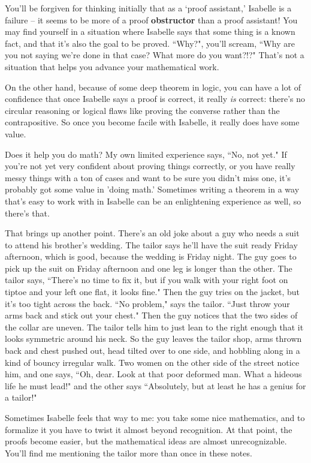 You'll be forgiven for thinking initially that as a `proof assistant,' Isabelle is a failure -- it seems to be more of a proof \textbf{obstructor} than a proof assistant! You may find yourself in a situation where Isabelle says that some thing is a known fact, and that it's also the goal to be proved. ``Why?", you'll scream, ``Why are you not saying we're done in that case? What more do you want?!?" That's not a situation that helps you advance your mathematical work.  

On the other hand, because of some deep theorem in logic, you can have a lot of confidence that once Isabelle says a proof is correct, it really \textit{is} correct: there's no circular reasoning or logical flaws like proving the converse rather than the contrapositive. So once you become facile with Isabelle, it really does have some value. 

Does it help you do math? My own limited experience says, ``No, not yet." If you're not yet very confident about proving things correctly, or you have really messy things with a ton of cases and want to be sure you didn't miss one, it's probably got some value in 'doing math.' Sometimes writing a theorem in a way that's easy to work with in Isabelle can be an enlightening experience as well, so there's that. 

That brings up another point. There's an old joke about a guy who needs a suit to attend his brother's wedding. The tailor says he'll have the suit ready Friday afternoon, which is good, because the wedding is Friday night. The guy goes to pick up the suit on Friday afternoon and one leg is longer than the other. The tailor says, ``There's no time to fix it, but if you walk with your right foot on tiptoe and your left one flat, it looks fine." Then the guy tries on the jacket, but it's too tight across the back. ``No problem," says the tailor. ``Just throw your arms back and stick out your chest." Then the guy notices that the two sides of the collar are uneven. The tailor tells him to just lean to the right enough that it looks symmetric around his neck. So the guy leaves the tailor shop, arms thrown back and chest pushed out, head tilted over to one side, and hobbling along in a kind of bouncy irregular walk. Two women on the other side of the street notice him, and one says, ``Oh, dear. Look at that poor deformed man. What a hideous life he must lead!" and the other says ``Absolutely, but at least he has a genius for a tailor!" 

Sometimes Isabelle feels that way to me: you take some nice mathematics, and to formalize it you have to twist it almost beyond recognition. At that point, the proofs become easier, but the mathematical ideas are almost unrecognizable. You'll find me mentioning the tailor more than once in these notes.

